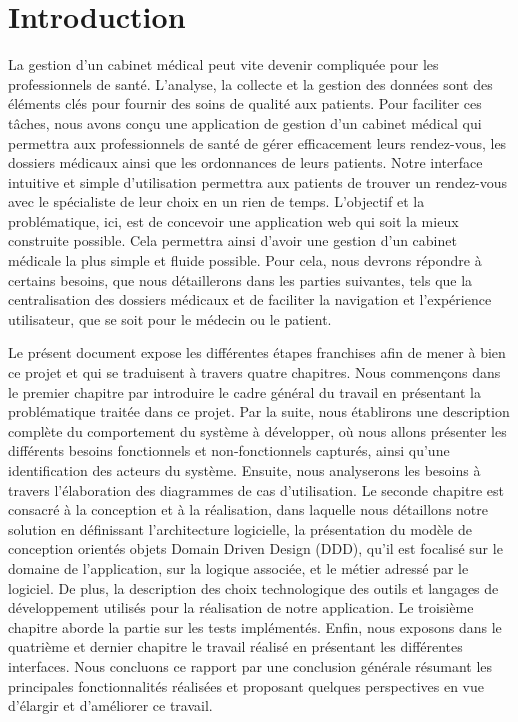 \documentclass[a4paper]{report}
\begin{document}
\chapter{Introduction}

La gestion d'un cabinet médical peut vite devenir compliquée pour les professionnels de santé. L'analyse, la collecte et la gestion des données sont des éléments 
clés pour fournir des soins de qualité aux patients. Pour faciliter ces tâches, nous avons conçu une application de gestion d'un cabinet 
médical qui permettra aux professionnels de santé de gérer efficacement leurs rendez-vous, les dossiers médicaux ainsi que les ordonnances de leurs patients. 
Notre interface intuitive et simple d'utilisation permettra aux patients de trouver un rendez-vous avec le spécialiste de leur choix en un rien de temps. \newline\newline
L'objectif et la problématique, ici, est de concevoir une application web qui soit la mieux construite possible. Cela permettra ainsi d'avoir une gestion d'un cabinet 
médicale la plus simple et fluide possible. Pour cela, nous devrons répondre à certains besoins, que nous détaillerons dans les parties suivantes, tels que la centralisation des dossiers médicaux
et de faciliter la navigation et l'expérience utilisateur, que se soit pour le médecin ou le patient.
 \newline\newline

Le présent document expose les différentes étapes franchises afin de mener à bien ce projet et qui se traduisent à travers quatre chapitres.
Nous commençons dans le premier chapitre par introduire le cadre général du travail en présentant la problématique traitée dans ce projet. Par la suite, nous établirons une description complète du comportement du système à développer, où nous allons présenter les différents besoins fonctionnels et non-fonctionnels capturés, ainsi qu’une identification des acteurs du système. Ensuite, nous analyserons les besoins à travers l’élaboration des diagrammes de cas d’utilisation.
\newline
Le seconde chapitre est consacré à la conception et à la réalisation, dans laquelle nous détaillons notre solution en définissant l’architecture logicielle, la présentation du modèle de conception orientés objets Domain Driven Design (DDD), qu'il est focalisé sur le domaine de l'application, sur la logique associée, et le métier adressé par le logiciel. De plus, la description des choix technologique des outils et langages de développement utilisés pour la réalisation de notre application.
\newline
Le troisième chapitre aborde la partie sur les tests implémentés.
\newline
Enfin, nous exposons dans le quatrième et dernier chapitre le travail réalisé en présentant les différentes interfaces.
\newline
Nous concluons ce rapport par une conclusion générale résumant les principales fonctionnalités réalisées et proposant 
quelques perspectives en vue d’élargir et d’améliorer ce travail. 
\end{document}
